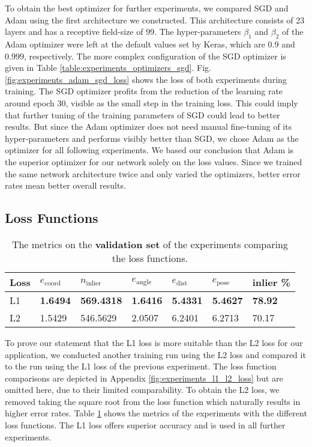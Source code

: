 To obtain the best optimizer for further experiments, we compared SGD and Adam using the first architecture we constructed. This architecture consists of 23 layers and has a receptive field-size of 99. The hyper-parameters $\beta_1$ and $\beta_2$ of the Adam optimizer were left at the default values set by Keras, which are $0.9$ and $0.999$, respectively. The more complex configuration of the SGD optimizer is given in Table \ref{table:experiments_optimizers_sgd}. Fig. \ref{fig:experiments_adam_sgd_loss} shows the loss of both experiments during training. The SGD optimizer profits from the reduction of the learning rate around epoch 30, visible as the small step in the training loss. This could imply that further tuning of the training parameters of SGD could lead to better results. But since the Adam optimizer does not need manual fine-tuning of its hyper-parameters and performs visibly better than SGD, we chose Adam as the optimizer for all following experiments. We based our conclusion that Adam is the superior optimizer for our network solely on the loss values. Since we trained the same network architecture twice and only varied the optimizers, better error rates mean better overall results.

\subsection{Loss Functions}

\begin{table}[]
\centering
\begin{tabular}{|l||llllll|}
\hline 
 Loss  & $e_{\text{coord}}$ & $n_{\text{inlier}}$ & $e_{\text{angle}}$ & $e_{\text{dist}}$  & $e_{\text{pose}}$ & inlier \%  \\ \hline \hline \rowcolor{Gray}
L1 & \textbf{1.6494} & \textbf{569.4318} & \textbf{1.6416} & \textbf{5.4331} & \textbf{5.4627} & \textbf{78.92} \\
L2 & 1.5429    & 546.5629    & 2.0507      & 6.2401 & 6.2713 & 70.17 \\ \hline   
\end{tabular}
\caption{The metrics on the \textbf{validation set} of the experiments comparing the loss functions.}
\label{table:experiments_loss_functions}
\end{table}

To prove our statement that the L1 loss is more suitable than the L2 loss for our application, we conducted another training run using the L2 loss and compared it to the run using the L1 loss of the previous experiment. The loss function comparisons are depicted in Appendix \ref{fig:experiments_l1_l2_loss} but are omitted here, due to their limited comparability. To obtain the L2 loss, we removed taking the square root from the loss function which naturally results in higher error rates. Table \ref{table:experiments_loss_functions} shows the metrics of the experiments with the different loss functions. The L1 loss offers superior accuracy and is used in all further experiments.

